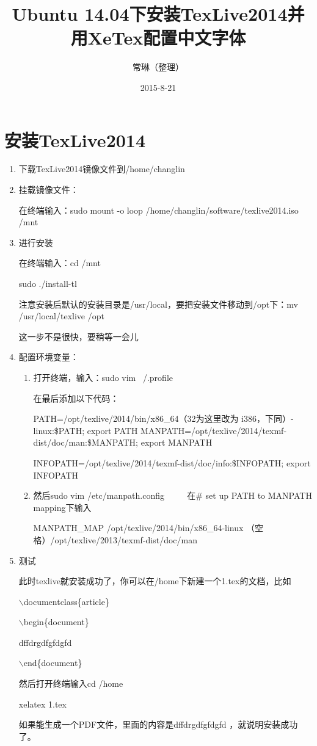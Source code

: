 \documentclass[a4paper,12pt]{article}
\title{Ubuntu 14.04下安装TexLive2014并用XeTex配置中文字体}
\author{常琳（整理）}
\date{2015-8-21}
\begin{document}
\maketitle
\section{安装TexLive2014}

\begin{enumerate}
\item 下载TexLive2014镜像文件到/home/changlin
\item 挂载镜像文件：

在终端输入：sudo mount -o loop /home/changlin/software/texlive2014.iso /mnt
\item 进行安装

在终端输入：cd /mnt

           sudo ./install-tl

注意安装后默认的安装目录是/usr/local，要把安装文件移动到/opt下：mv /usr/local/texlive /opt

这一步不是很快，要稍等一会儿

\item 配置环境变量：
  
  \begin{enumerate}
   \item 打开终端，输入：sudo vim ~/.profile 　

         在最后添加以下代码：

        PATH=/opt/texlive/2014/bin/x86\_64（32为这里改为 i386，下同）-linux:\$PATH; export PATH
        MANPATH=/opt/texlive/2014/texmf-dist/doc/man:\$MANPATH; export MANPATH

        INFOPATH=/opt/texlive/2014/texmf-dist/doc/info:\$INFOPATH; export INFOPATH

   \item 然后sudo vim /etc/manpath.config
　　 在\# set up PATH to MANPATH mapping下输入

        MANPATH\_MAP /opt/texlive/2014/bin/x86\_64-linux （空格）/opt/texlive/2013/texmf-dist/doc/man
  
  \end{enumerate}
\item 测试

此时texlive就安装成功了，你可以在/home下新建一个1.tex的文档，比如

$\backslash$documentclass\{article\}

$\backslash$begin\{document\}

dffdrgdfgfdgfd

$\backslash$end\{document\}

然后打开终端输入cd /home

               xelatex 1.tex

如果能生成一个PDF文件，里面的内容是dffdrgdfgfdgfd ，就说明安装成功了。

\end{enumerate}
\end{document}
